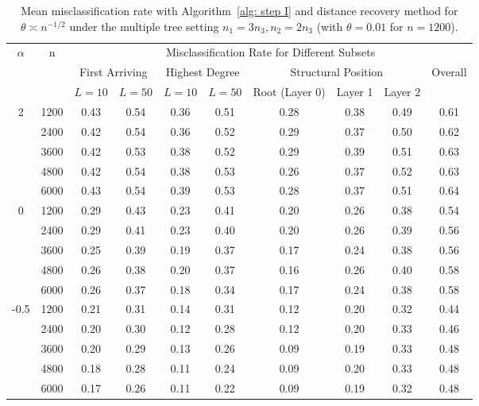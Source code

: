 \documentclass[twoside,11pt]{article}
\theoremstyle{remark}
\begin{document}
\begin{table}[tbp]
\setlength{\tabcolsep}{3.5pt}

\centering

{
\begin{tabular}{c|c|cc|cc|ccc|c}
\hline
\hline
\multirow{3}{*}{$\alpha$} & \multirow{3}{*}{n}
& \multicolumn{8}{c}{Misclassification Rate for Different Subsets} \\
\cline{3-10}
& 
& \multicolumn{2}{c|}{First Arriving}
& \multicolumn{2}{c|}{Highest Degree}
& \multicolumn{3}{c|}{Structural Position}
& \multirow{2}{*}{Overall} \\
\cline{3-9}
& 
& $L=10$ & $L=50$
& $L=10$ & $L=50$
& Root (Layer 0) & Layer 1 & Layer 2
& \\
\hline
\multirow{5}{*}{2}
& 1200 & 0.43 & 0.54 & 0.36 & 0.51 & 0.28 & 0.38 & 0.49 & 0.61 \\
& 2400 & 0.42 & 0.54 & 0.36 & 0.52 & 0.29 & 0.37 & 0.50 & 0.62 \\
& 3600 & 0.42 & 0.53 & 0.38 & 0.52 & 0.29 & 0.39 & 0.51 & 0.63 \\
& 4800 & 0.42 & 0.54 & 0.38 & 0.53 & 0.26 & 0.37 & 0.52 & 0.63 \\
& 6000 & 0.43 & 0.54 & 0.39 & 0.53 & 0.28 & 0.37 & 0.51 & 0.64 \\
\hline
\multirow{5}{*}{0}
& 1200 & 0.29 & 0.43 & 0.23 & 0.41 & 0.20 & 0.26 & 0.38 & 0.54 \\
& 2400 & 0.29 & 0.41 & 0.23 & 0.40 & 0.20 & 0.26 & 0.39 & 0.56 \\
& 3600 & 0.25 & 0.39 & 0.19 & 0.37 & 0.17 & 0.24 & 0.38 & 0.56 \\
& 4800 & 0.26 & 0.38 & 0.20 & 0.37 & 0.16 & 0.26 & 0.40 & 0.58 \\
& 6000 & 0.26 & 0.37 & 0.18 & 0.34 & 0.17 & 0.24 & 0.38 & 0.58 \\
\hline
\multirow{5}{*}{-0.5}
& 1200 & 0.21 & 0.31 & 0.14 & 0.31 & 0.12 & 0.20 & 0.32 & 0.44 \\
& 2400 & 0.20 & 0.30 & 0.12 & 0.28 & 0.12 & 0.20 & 0.33 & 0.46 \\
& 3600 & 0.20 & 0.29 & 0.13 & 0.26 & 0.09 & 0.19 & 0.33 & 0.48 \\
& 4800 & 0.18 & 0.28 & 0.11 & 0.24 & 0.09 & 0.20 & 0.33 & 0.48 \\
& 6000 & 0.17 & 0.26 & 0.11 & 0.22 & 0.09 & 0.19 & 0.32 & 0.48 \\
\hline
\hline
\end{tabular}
}


\caption{Mean misclassification rate with Algorithm~\ref{alg: step I} and distance recovery method for $\theta \asymp n^{-1/2}$ under the multiple tree setting $n_1 = 3 n_3, n_2=2 n_3$ (with $\theta=0.01$ for $n=1200$).}
\label{tab:mean_error_scale_n12 3}
\end{table}
\end{document}
